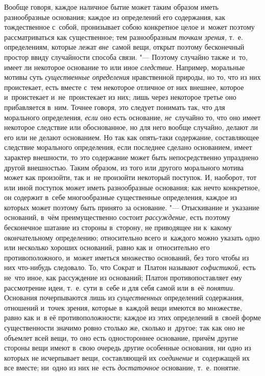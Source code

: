Вообще говоря, каждое наличное бытие может таким образом иметь разнообразные
основания; каждое из определений его содержания, как тождественное с~собой,
пронизывает собою конкретное целое и~может поэтому рассматриваться как
существенное; тем разнообразным {\em точкам зрения,} т.~е. определениям,
которые лежат {\em вне}~самой вещи, открыт поэтому бесконечный простор ввиду
случайности способа связи. "--- Поэтому случайно также и~то, имеет ли некоторое
основание то или иное {\em следствие}. Например, моральные мотивы суть
{\em существенные определения} нравственной природы, но то, что из них
проистекает, есть вместе с~тем некоторое отличное от них внешнее, которое
и~проистекает и~не~проистекает из них; лишь через некоторое третье оно
прибавляется в~ним. Точнее говоря, это следует понимать так, что для морального
определения, {\em если} оно есть основание, {\em не}~случайно то, что оно имеет
некоторое следствие или обоснованное, но для него вообще случайно, делают ли
его или не делают основанием. Но так как опять-таки содержание, составляющее
следствие морального определения, если последнее сделано основанием, имеет
характер внешности, то это содержание может быть непосредственно упразднено
другой внешностью. Таким образом, из того или другого морального мотива может
как произойти, так и~не произойти некоторый поступок. И, наоборот, тот или иной
поступок может иметь разнообразные основания; как нечто конкретное, он содержит
в~себе многообразные существенные определения, каждое из которых может поэтому
быть принято за основание. "--- Отыскивание и~указание оснований, в~чём
преимущественно состоит {\em рассуждение,} есть поэтому бесконечное шатание из
стороны в~сторону, не приводящее ни к~какому окончательному определению;
относительно всего и~каждого можно указать одно или несколько хороших
оснований, равно как и~относительно его противоположного, и~может иметься
множество оснований, без того чтобы из них что-нибудь следовало. То, что Сократ
и~Платон называют {\em софистикой,} есть не~что иное, как рассуждение из
оснований; Платон противопоставляет ему рассмотрение идеи, т.~е. сути в~себе и
для себя самой или в~её {\em понятии}. Основания почерпываются лишь из
{\em существенных} определений содержания, отношений и~точек зрения, которые
в~каждой вещи имеются во множестве, равно как и~в её противоположности; каждое
из этих определений в~своей форме существенности значимо ровно столько же,
сколько и~другое; так как оно не объемлет всей вещи, то оно есть одностороннее
основание, причём другие стороны вещи имеют в~свою очередь другие особенные
основания, ни одно из которых не исчерпывает вещи, составляющей их
{\em соединение} и~содержащей их все вместе; ни~одно из них не~есть
{\em достаточное} основание, т.~е. понятие.


